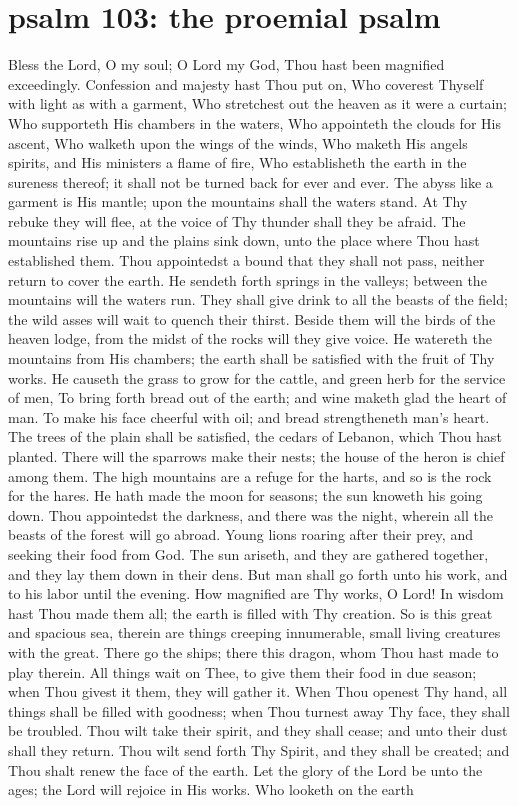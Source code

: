 \section{psalm 103: the proemial psalm}

\begin{liturgicaltext}
    \reader Bless the Lord, O my soul; O Lord my God, Thou hast been magnified exceedingly. Confession and majesty hast Thou put on, Who coverest Thyself with light as with a garment, Who stretchest out the heaven as it were a curtain; Who supporteth His chambers in the waters, Who appointeth the clouds for His ascent, Who walketh upon the wings of the winds, Who maketh His angels spirits, and His ministers a flame of fire, Who establisheth the earth in the sureness thereof; it shall not be turned back for ever and ever.  The abyss like a garment is His mantle; upon the mountains shall the waters stand.  At Thy rebuke they will flee, at the voice of Thy thunder shall they be afraid.  The mountains rise up and the plains sink down, unto the place where Thou hast established them.  Thou appointedst a bound that they shall not pass, neither return to cover the earth.  He sendeth forth springs in the valleys; between the mountains will the waters run.  They shall give drink to all the beasts of the field; the wild asses will wait to quench their thirst.  Beside them will the birds of the heaven lodge, from the midst of the rocks will they give voice.  He watereth the mountains from His chambers; the earth shall be satisfied with the fruit of Thy works.  He causeth the grass to grow for the cattle, and green herb for the service of men, To bring forth bread out of the earth; and wine maketh glad the heart of man.  To make his face cheerful with oil; and bread strengtheneth man's heart.  The trees of the plain shall be satisfied, the cedars of Lebanon, which Thou hast planted.  There will the sparrows make their nests; the house of the heron is chief among them.  The high mountains are a refuge for the harts, and so is the rock for the hares.  He hath made the moon for seasons; the sun knoweth his going down.  Thou appointedst the darkness, and there was the night, wherein all the beasts of the forest will go abroad.  Young lions roaring after their prey, and seeking their food from God. The sun ariseth, and they are gathered together, and they lay them down in their dens. But man shall go forth unto his work, and to his labor until the evening. How magnified are Thy works, O Lord! In wisdom hast Thou made them all; the earth is filled with Thy creation. So is this great and spacious sea, therein are things creeping innumerable, small living creatures with the great. There go the ships; there this dragon, whom Thou hast made to play therein. All things wait on Thee, to give them their food in due season; when Thou givest it them, they will gather it. When Thou openest Thy hand, all things shall be filled with goodness; when Thou turnest away Thy face, they shall be troubled.  Thou wilt take their spirit, and they shall cease; and unto their dust shall they return.  Thou wilt send forth Thy Spirit, and they shall be created; and Thou shalt renew the face of the earth.  Let the glory of the Lord be unto the ages; the Lord will rejoice in His works.  Who looketh on the earth 
\end{liturgicaltext}
